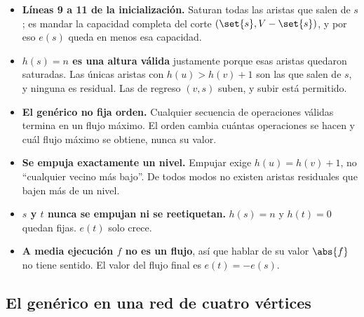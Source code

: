 \documentclass[11pt,letterpaper]{article}
\begin{document}
\begin{itemize}
  \item \textbf{Líneas 9 a 11 de la inicialización.} Saturan todas las
        aristas que salen de $s$; es mandar la capacidad completa del
        corte $(\set{s}, V - \set{s})$, y por eso $e(s)$ queda en menos
        esa capacidad.
  \item \textbf{$h(s) = n$ es una altura válida} justamente porque esas
        aristas quedaron saturadas. Las únicas aristas con
        $h(u) > h(v) + 1$ son las que salen de $s$, y ninguna es
        residual. Las de regreso $(v, s)$ suben, y subir está permitido.
  \item \textbf{El genérico no fija orden.} Cualquier secuencia de
        operaciones válidas termina en un flujo máximo. El orden cambia
        cuántas operaciones se hacen y cuál flujo máximo se obtiene,
        nunca su valor.
\end{itemize}

\begin{ojo}
  \begin{itemize}
    \item \textbf{Se empuja exactamente un nivel.} Empujar exige
          $h(u) = h(v) + 1$, no ``cualquier vecino más bajo''. De todos
          modos no existen aristas residuales que bajen más de un
          nivel.
    \item \textbf{$s$ y $t$ nunca se empujan ni se reetiquetan.}
          $h(s) = n$ y $h(t) = 0$ quedan fijas. $e(t)$ solo crece.
    \item \textbf{A media ejecución $f$ no es un flujo}, así que
          hablar de su valor $\abs{f}$ no tiene sentido. El valor del
          flujo final es $e(t) = -e(s)$.
  \end{itemize}
\end{ojo}


\subsection*{El genérico en una red de cuatro vértices}
\end{document}
